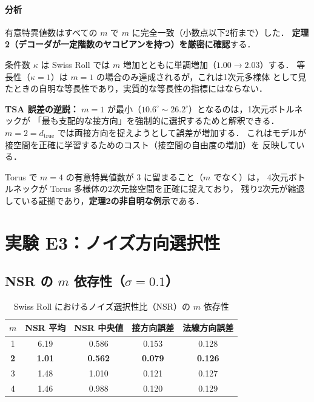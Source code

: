 \documentclass[12pt,a4paper]{ltjsarticle}  %
\newcommand{\dtrue}{d_{\mathrm{true}}}
\begin{document}
\paragraph{分析}
有意特異値数はすべての $m$ で $m$ に完全一致（小数点以下2桁まで）した．
\textbf{定理2（デコーダが一定階数のヤコビアンを持つ）を厳密に確認}する．

条件数 $\kappa$ は Swiss Roll では $m$ 増加とともに単調増加（$1.00 \to 2.03$）する．
等長性（$\kappa = 1$）は $m = 1$ の場合のみ達成されるが，これは1次元多様体
として見たときの自明な等長性であり，実質的な等長性の指標にはならない．

\textbf{TSA 誤差の逆説：}
$m = 1$ が最小（$10.6^\circ \sim 26.2^\circ$）となるのは，1次元ボトルネックが
「最も支配的な接方向」を強制的に選択するためと解釈できる．
$m = 2 = \dtrue$ では両接方向を捉えようとして誤差が増加する．
これはモデルが接空間を正確に学習するためのコスト（接空間の自由度の増加）を
反映している．

Torus で $m = 4$ の有意特異値数が 3 に留まること（$m$ でなく）は，
4次元ボトルネックが Torus 多様体の2次元接空間を正確に捉えており，
残り2次元が縮退している証拠であり，\textbf{定理2の非自明な例示}である．

\section{実験 E3：ノイズ方向選択性}

\subsection{NSR の $m$ 依存性（$\sigma = 0.1$）}

\begin{table}[H]
  \centering
  \caption{Swiss Roll におけるノイズ選択性比（NSR）の $m$ 依存性}
  \label{tab:e3}
  \renewcommand{\arraystretch}{1.2}
  \begin{tabular}{ccccc}
    \toprule
    $m$ & NSR 平均 & NSR 中央値 & 接方向誤差 & 法線方向誤差 \\
    \midrule
    1            & 6.19 & 0.586 & 0.153 & 0.128 \\
    \textbf{2}   & \textbf{1.01} & \textbf{0.562} & \textbf{0.079} & \textbf{0.126} \\
    3            & 1.48 & 1.010 & 0.121 & 0.127 \\
    4            & 1.46 & 0.988 & 0.120 & 0.129 \\
    \bottomrule
  \end{tabular}
\end{table}
\end{document}
